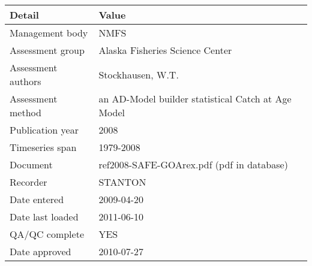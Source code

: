 \begin{table}[htb]
\centering
\begin{tabular}{lp{7cm}}
\toprule
Detail & Value \\
\midrule
Management body    & NMFS                                               \\
Assessment group   & Alaska Fisheries Science Center                    \\
Assessment authors & Stockhausen, W.T.                                  \\
Assessment method  & an AD-Model builder statistical Catch at Age Model \\
Publication year   & 2008                                               \\
Timeseries span    & 1979-2008                                          \\
Document           & ref2008-SAFE-GOArex.pdf (pdf in database)          \\
Recorder           & STANTON                                            \\
Date entered       & 2009-04-20                                         \\
Date last loaded   & 2011-06-10                                         \\
QA/QC complete     & YES                                                \\
Date approved      & 2010-07-27                                         \\
\bottomrule
\end{tabular}
\label{tab:assessdet}
\end{table}
